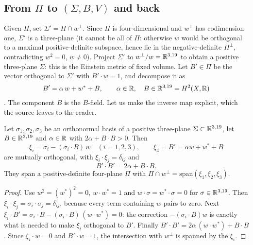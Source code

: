 \subsection{From \texorpdfstring{$\Pi$}{Pi} to \texorpdfstring{$(\Sigma,B,V)$}{(Sigma,B,V)}
and back}
Given $\Pi$, set $\Sigma'=\Pi\cap w^\perp$. Since $\Pi$ is four-dimensional and $w^\perp$ has
codimension one, $\Sigma'$ is a three-plane (it cannot be all of $\Pi$: otherwise $w$ would be
orthogonal to a maximal positive-definite subspace, hence lie in the negative-definite
$\Pi^\perp$, contradicting $w^2=0$, $w\neq0$). Project $\Sigma'$ to $w^\perp/w=\mathbb{R}^{3,19}$ to
obtain a positive three-plane $\Sigma$: this is the Einstein metric of fixed volume. Let
$B'\in\Pi$ be the vector orthogonal to $\Sigma'$ with $B'\cdot w=1$, and decompose it as
\begin{equation}\label{eq:stringsk3:Bprime}
  B'=\alpha\,w+w^*+B,\qquad \alpha\in\mathbb{R},\quad B\in\mathbb{R}^{3,19}=H^2(X,\mathbb{R})
\end{equation}
. The component $B$ is the $B$-field. Let us make
the inverse map explicit, which the source leaves to the reader.

\begin{proposition}\label{thm:stringsk3:plane}
Let $\sigma_1,\sigma_2,\sigma_3$ be an orthonormal basis of a positive three-plane
$\Sigma\subset\mathbb{R}^{3,19}$, let $B\in\mathbb{R}^{3,19}$ and $\alpha\in\mathbb{R}$ with $2\alpha+B\cdot B>0$. Then
\begin{equation}\label{eq:stringsk3:basis}
  \xi_i=\sigma_i-(\sigma_i\cdot B)\,w\quad(i=1,2,3),\qquad \xi_4=B'=\alpha w+w^*+B
\end{equation}
are mutually orthogonal, with $\xi_i\cdot\xi_j=\delta_{ij}$ and
\begin{equation}\label{eq:stringsk3:volume}
  B'\cdot B'=2\alpha+B\cdot B .
\end{equation}
They span a positive-definite four-plane $\Pi$ with $\Pi\cap w^\perp=\mathrm{span}(\xi_1,
\xi_2,\xi_3)$.
\end{proposition}
\begin{proof}
Use $w^2=(w^*)^2=0$, $w\cdot w^*=1$ and $w\cdot\sigma=w^*\cdot\sigma=0$ for
$\sigma\in\mathbb{R}^{3,19}$. Then $\xi_i\cdot\xi_j=\sigma_i\cdot\sigma_j=\delta_{ij}$, because every
term containing $w$ pairs to zero. Next
$\xi_i\cdot B'=\sigma_i\cdot B-(\sigma_i\cdot B)\,(w\cdot w^*)=0$: the correction
$-(\sigma_i\cdot B)w$ is exactly what is needed to make $\xi_i$ orthogonal to $B'$. Finally
$B'\cdot B'=2\alpha\,(w\cdot w^*)+B\cdot B$. Since $\xi_i\cdot w=0$ and $B'\cdot w=1$, the
intersection with $w^\perp$ is spanned by the $\xi_i$.
\end{proof}

